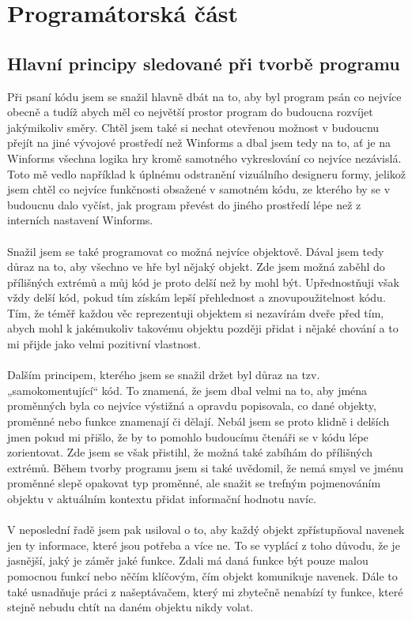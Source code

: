 \documentclass[a4]{article}
\begin{document}
\section{Programátorská část}
\subsection{Hlavní principy sledované při tvorbě programu}
Při psaní kódu jsem se snažil hlavně dbát na to, aby byl program psán co nejvíce obecně a tudíž abych měl co největší prostor program do budoucna rozvíjet jakýmikoliv směry. Chtěl jsem také si nechat otevřenou možnost v budoucnu přejít na jiné vývojové prostředí než Winforms a dbal jsem tedy na to, ať je na Winforms všechna logika hry kromě samotného vykreslování co nejvíce nezávislá. Toto mě vedlo například k úplnému odstranění vizuálního designeru formy, jelikož jsem chtěl co nejvíce funkčnosti obsažené v samotném kódu, ze kterého by se v budoucnu dalo vyčíst, jak program převést do jiného prostředí lépe než z interních nastavení Winforms.
\\\\
Snažil jsem se také programovat co možná nejvíce objektově. Dával jsem tedy důraz na to, aby všechno ve hře byl nějaký objekt. Zde jsem možná zaběhl do přílišných extrémů a můj kód je proto delší než by mohl být. Upřednostňuji však vždy delší kód, pokud tím získám lepší přehlednost a znovupoužitelnost kódu. Tím, že téměř každou věc reprezentuji objektem si nezavírám dveře před tím, abych mohl k jakémukoliv takovému objektu později přidat i nějaké chování a to mi přijde jako velmi pozitivní vlastnost.
\\\\
Dalším principem, kterého jsem se snažil držet byl důraz na tzv. „samokomentující“ kód. To znamená, že jsem dbal velmi na to, aby jména proměnných byla co nejvíce výstižná a opravdu popisovala, co dané objekty, proměnné nebo funkce znamenají či dělají. Nebál jsem se proto klidně i delších jmen pokud mi přišlo, že by to pomohlo budoucímu čtenáři se v kódu lépe zorientovat. Zde jsem se však přistihl, že možná také zabíhám do přílišných extrémů. Během tvorby programu jsem si také uvědomil, že nemá smysl ve jménu proměnné slepě opakovat typ proměnné, ale snažit se trefným pojmenováním objektu v aktuálním kontextu přidat informační hodnotu navíc.
\\\\
V neposlední řadě jsem pak usiloval o to, aby každý objekt zpřístupňoval navenek jen ty informace, které jsou potřeba a více ne. To se vyplácí z toho důvodu, že je jasnější, jaký je záměr jaké funkce. Zdali má daná funkce být pouze malou pomocnou funkcí nebo něčím klíčovým, čím objekt komunikuje navenek. Dále to také usnadňuje práci z našeptávačem, který mi zbytečně nenabízí ty funkce, které stejně nebudu chtít na daném objektu nikdy volat.
\end{document}
